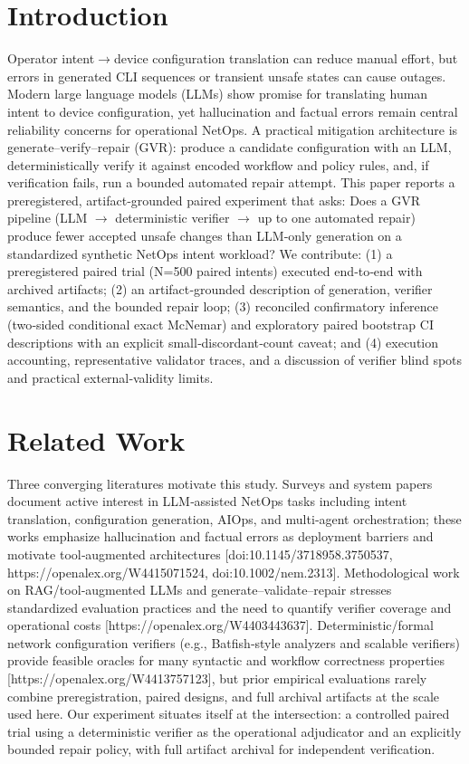 \documentclass[conference]{IEEEtran}
\begin{document}
\section{Introduction}
Operator intent\ensuremath{\rightarrow}device configuration translation can reduce manual effort, but errors in generated CLI sequences or transient unsafe states can cause outages. Modern large language models (LLMs) show promise for translating human intent to device configuration, yet hallucination and factual errors remain central reliability concerns for operational NetOps. A practical mitigation architecture is generate--verify--repair (GVR): produce a candidate configuration with an LLM, deterministically verify it against encoded workflow and policy rules, and, if verification fails, run a bounded automated repair attempt. This paper reports a preregistered, artifact‑grounded paired experiment that asks: Does a GVR pipeline (LLM \ensuremath{\rightarrow} deterministic verifier \ensuremath{\rightarrow} up to one automated repair) produce fewer accepted unsafe changes than LLM‑only generation on a standardized synthetic NetOps intent workload? We contribute: (1) a preregistered paired trial (N=500 paired intents) executed end‑to‑end with archived artifacts; (2) an artifact‑grounded description of generation, verifier semantics, and the bounded repair loop; (3) reconciled confirmatory inference (two‑sided conditional exact McNemar) and exploratory paired bootstrap CI descriptions with an explicit small‑discordant‑count caveat; and (4) execution accounting, representative validator traces, and a discussion of verifier blind spots and practical external‑validity limits.

\section{Related Work}
Three converging literatures motivate this study. Surveys and system papers document active interest in LLM‑assisted NetOps tasks including intent translation, configuration generation, AIOps, and multi‑agent orchestration; these works emphasize hallucination and factual errors as deployment barriers and motivate tool‑augmented architectures [doi:10.1145/3718958.3750537, https://openalex.org/W4415071524, doi:10.1002/nem.2313]. Methodological work on RAG/tool‑augmented LLMs and generate--validate--repair stresses standardized evaluation practices and the need to quantify verifier coverage and operational costs [https://openalex.org/W4403443637]. Deterministic/formal network configuration verifiers (e.g., Batfish‑style analyzers and scalable verifiers) provide feasible oracles for many syntactic and workflow correctness properties [https://openalex.org/W4413757123], but prior empirical evaluations rarely combine preregistration, paired designs, and full archival artifacts at the scale used here. Our experiment situates itself at the intersection: a controlled paired trial using a deterministic verifier as the operational adjudicator and an explicitly bounded repair policy, with full artifact archival for independent verification.
\end{document}
